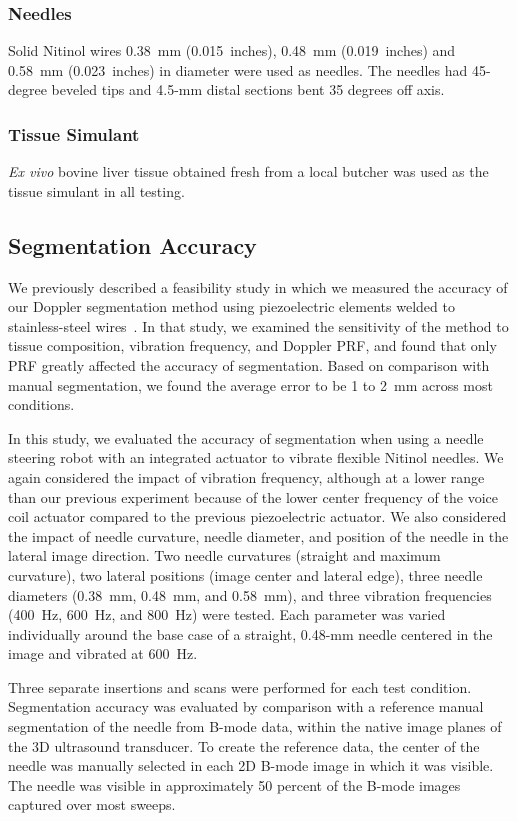 \subsubsection{Needles}
Solid Nitinol wires 0.38~mm (0.015~inches), 0.48~mm (0.019~inches) and 0.58~mm (0.023~inches) in diameter were used as needles. The needles had 45-degree beveled tips and 4.5-mm distal sections bent 35 degrees off axis.

\subsubsection{Tissue Simulant}
\textit{Ex vivo} bovine liver tissue obtained fresh from a local butcher was used as the tissue simulant in all testing.

\subsection{Segmentation Accuracy}
We previously described a feasibility study in which we measured the accuracy of our Doppler segmentation method using piezoelectric elements welded to stainless-steel wires~\cite{Adebar2013}. In that study, we examined the sensitivity of the method to tissue composition, vibration frequency, and Doppler PRF, and found that only PRF greatly affected the accuracy of segmentation. Based on comparison with manual segmentation, we found the average error to be 1 to 2~mm across most conditions.

In this study, we evaluated the accuracy of segmentation when using a needle steering robot with an integrated actuator to vibrate flexible Nitinol needles. We again considered the impact of vibration frequency, although at a lower range than our previous experiment because of the lower center frequency of the voice coil actuator compared to the previous piezoelectric actuator. We also considered the impact of needle curvature, needle diameter, and position of the needle in the lateral image direction. Two needle curvatures (straight and maximum curvature), two lateral positions (image center and lateral edge), three needle diameters (0.38~mm, 0.48~mm, and 0.58~mm), and three vibration frequencies (400~Hz, 600~Hz, and 800~Hz) were tested. Each parameter was varied individually around the base case of a straight, 0.48-mm needle centered in the image and vibrated at 600~Hz. 

Three separate insertions and scans were performed for each test condition. Segmentation accuracy was evaluated by comparison with a reference manual segmentation of the needle from B-mode data, within the native image planes of the 3D ultrasound transducer. To create the reference data, the center of the needle was manually selected in each 2D B-mode image in which it was visible. The needle was visible in approximately 50 percent of the B-mode images captured over most sweeps. 

